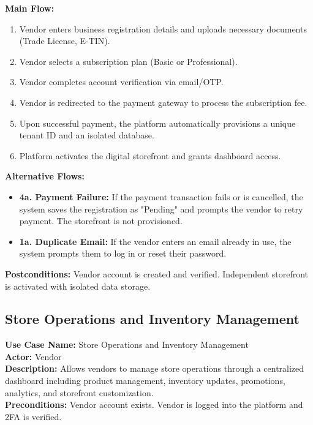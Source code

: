 \vspace{0.2cm}
\textbf{Main Flow:} 
\begin{enumerate}
    \item Vendor enters business registration details and uploads necessary documents (Trade License, E-TIN).
    \item Vendor selects a subscription plan (Basic or Professional).
    \item Vendor completes account verification via email/OTP.
    \item Vendor is redirected to the payment gateway to process the subscription fee.
    \item Upon successful payment, the platform automatically provisions a unique tenant ID and an isolated database.
    \item Platform activates the digital storefront and grants dashboard access.
\end{enumerate}

\textbf{Alternative Flows:}
\begin{itemize}
    \item \textbf{4a. Payment Failure:} If the payment transaction fails or is cancelled, the system saves the registration as "Pending" and prompts the vendor to retry payment. The storefront is not provisioned.
    \item \textbf{1a. Duplicate Email:} If the vendor enters an email already in use, the system prompts them to log in or reset their password.
\end{itemize}

\vspace{0.2cm}
\textbf{Postconditions:} Vendor account is created and verified. Independent storefront is activated with isolated data storage.


\vspace{0.5cm}
\subsection{Store Operations and Inventory Management}
\textbf{Use Case Name:} Store Operations and Inventory Management\\
\textbf{Actor:} Vendor\\
\textbf{Description:} Allows vendors to manage store operations through a centralized dashboard including product management, inventory updates, promotions, analytics, and storefront customization.\\
\textbf{Preconditions:} Vendor account exists. Vendor is logged into the platform and 2FA is verified.

